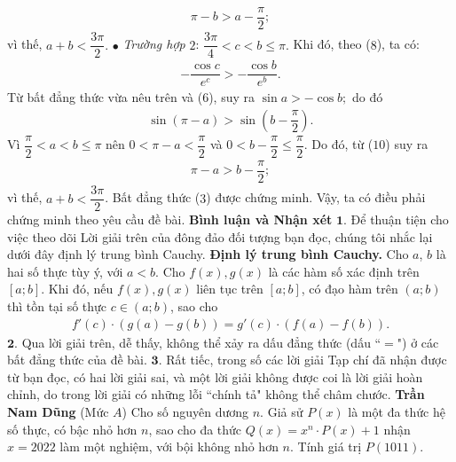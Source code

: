 \begin{multicols}{2}
	\begin{align*}
		\pi  - b > a - \dfrac{\pi }{2};
	\end{align*}
	vì thế, $a + b < \dfrac{{3\pi }}{2}.$
	\vskip 0.05cm  
	$\bullet$ \textit{Trường hợp} $2$:  $\dfrac{{3\pi }}{4} < c < b \le \pi.$
	\vskip 0.05cm 
	Khi đó, theo ($8$), ta có:
	\begin{align*}
		- \dfrac{{\cos c}}{{{e^c}}} >  - \dfrac{{\cos b}}{{{e^b}}}.
	\end{align*}
	Từ bất đẳng thức vừa nêu trên và ($6$), suy ra  $\sin a >  - \cos b;$ do đó
	\begin{align*}
		\sin \left( {\pi  - a} \right) > \sin \left( {b - \dfrac{\pi }{2}} \right). \tag{$10$}
	\end{align*}
	Vì $\dfrac{\pi }{2} < a < b \le \pi $  nên  $0 < \pi  - a < \dfrac{\pi }{2}$ và  $0 < b - \dfrac{\pi }{2} \le \dfrac{\pi }{2}.$ Do đó, từ ($10$) suy ra
	\begin{align*}
		\pi  - a > b - \dfrac{\pi }{2};
	\end{align*}
	vì thế,  $a + b < \dfrac{{3\pi }}{2}$.
	\vskip 0.05cm 
	Bất đẳng thức ($3$) được chứng minh.
	\vskip 0.05cm
	Vậy, ta có điều phải chứng minh theo yêu cầu đề bài.
	\vskip 0.05cm
	\textbf{\color{thachthuctoanhoc}Bình luận và Nhận xét}
	\vskip 0.05cm
	$\pmb{1.}$ Để thuận tiện cho việc theo dõi Lời giải trên của đông đảo đối tượng bạn đọc, chúng tôi nhắc lại dưới đây định lý trung bình Cauchy.
	\vskip 0.05cm
	\textbf{\color{thachthuctoanhoc}Định lý trung bình Cauchy.} Cho $a$, $b$ là hai số thực tùy ý, với $a < b$. Cho $f(x), g(x)$ là các hàm số xác định trên $[a;b]$.  Khi đó, nếu  $f(x), g(x)$  liên tục trên $[a;b]$, có đạo hàm trên  $(a;b)$ thì tồn tại số thực $c \in (a;b)$,  sao cho
	\begin{align*}
		f'\left( c \right) \!\cdot\! \left( {g\left( a \right) \!-\! g\left( b \right)} \right) \!=\! g'\left( c \right) \!\cdot\! \left( {f\left( a \right) \!-\! f\left( b \right)} \right).
	\end{align*}
	$\pmb{2.}$ Qua lời giải trên, dễ thấy, không thể xảy ra dấu đẳng thức (dấu ``$=$") ở các bất đẳng thức của đề bài.
	\vskip 0.05cm
	$\pmb{3.}$ Rất tiếc, trong số các lời giải Tạp chí đã nhận được từ bạn đọc, có hai lời giải sai, và một lời giải không được coi là lời giải hoàn chỉnh, do trong lời giải có những lỗi ``chính tả" không thể châm chước. 
	\vskip 0.1cm
		\hfill\textbf{\color{thachthuctoanhoc}Trần Nam Dũng}
	\vskip 0.1cm
	{}
	(Mức $A$)
	Cho số nguyên dương $n$. Giả sử $P(x)$ là một đa thức hệ số thực, có bậc nhỏ hơn $n$, sao cho đa thức $Q\left( x \right) = {x^n} \cdot P\left( x \right) + 1$  nhận $x = 2022$ làm một nghiệm, với bội không nhỏ hơn $n$. Tính giá trị  $P(1011)$.

\end{multicols}
